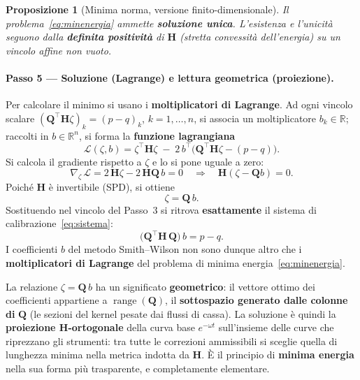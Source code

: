 \documentclass[11pt,a4paper]{article}
\theoremstyle{plain}
\newtheorem{proposizione}[teorema]{Proposizione}
\theoremstyle{definition}
\theoremstyle{remark}
\newcommand{\Qmat}{\mathbf{Q}}
\newcommand{\Hmat}{\mathbf{H}}
\newcommand{\transp}{^{\!\top}}
\begin{document}
\begin{proposizione}[Minima norma, versione finito-dimensionale]
\label{prop:minnorm-finita}
Il problema~\eqref{eq:minenergia} ammette \textbf{soluzione unica}. L'esistenza e
l'unicit\`a seguono dalla \textbf{definita positivit\`a} di $\Hmat$ (stretta
convessit\`a dell'energia) su un vincolo affine non vuoto.
\end{proposizione}

\paragraph{Passo 5 --- Soluzione (Lagrange) e lettura geometrica (proiezione).}
Per calcolare il minimo si usano i \textbf{moltiplicatori di Lagrange}.
Ad ogni vincolo scalare $(\Qmat\transp\Hmat\zeta)_k = (p-q)_k$, $k=1,\ldots,n$,
si associa un moltiplicatore $b_k\in\mathbb{R}$; raccolti in $b\in\mathbb{R}^n$, si forma la
\textbf{funzione lagrangiana}
\begin{equation}
  \mathcal{L}(\zeta,b)
  = \zeta\transp\Hmat\zeta
    \;-\; 2\,b\transp\!\bigl(\Qmat\transp\Hmat\zeta - (p-q)\bigr).
  \label{eq:lagrangiana}
\end{equation}
Si calcola il gradiente rispetto a $\zeta$ e lo si pone uguale a zero:
\[
  \nabla_\zeta\,\mathcal{L}
  = 2\,\Hmat\zeta - 2\,\Hmat\Qmat\,b = 0
  \quad\Longrightarrow\quad
  \Hmat(\zeta - \Qmat b) = 0.
\]
Poich\'e $\Hmat$ \`e invertibile (SPD), si ottiene
\[
  \zeta = \Qmat\, b .
\]
Sostituendo nel vincolo del Passo~3 si ritrova \textbf{esattamente} il sistema di
calibrazione~\eqref{eq:sistema}:
\[
  \bigl(\Qmat\transp \Hmat\, \Qmat\bigr)\, b = p - q .
\]
I coefficienti $b$ del metodo Smith--Wilson non sono dunque altro che i
\textbf{moltiplicatori di Lagrange} del problema di minima energia~\eqref{eq:minenergia}.

La relazione $\zeta = \Qmat\,b$ ha un significato \textbf{geometrico}: il vettore ottimo dei
coefficienti appartiene a $\operatorname{range}(\Qmat)$, il \textbf{sottospazio generato
dalle colonne di} $\Qmat$ (le sezioni del kernel pesate dai flussi di cassa). La soluzione
\`e quindi la \textbf{proiezione $\Hmat$-ortogonale} della curva base $e^{-\omega t}$
sull'insieme delle curve che riprezzano gli strumenti: tra tutte le correzioni ammissibili
si sceglie quella di lunghezza minima nella metrica indotta da $\Hmat$. \`E il principio di
\textbf{minima energia} nella sua forma pi\`u trasparente, e completamente elementare.
\end{document}
